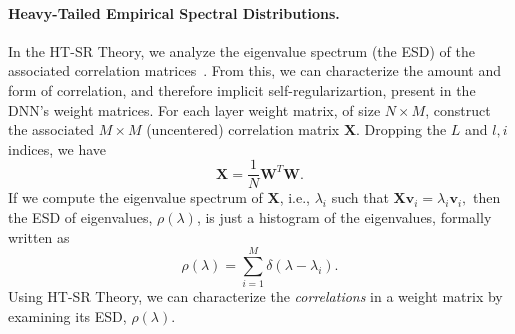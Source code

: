 \paragraph{Heavy-Tailed Empirical Spectral Distributions.}
%
%
In the HT-SR Theory, we analyze the eigenvalue spectrum (the ESD) of the associated correlation matrices~\cite{MM18_TR,MM19_HTSR_ICML}.
From this, we can characterize the amount and form of correlation, and therefore implicit self-regularizartion, present in the DNN's weight matrices.
For each layer weight matrix, of size $N \times M$, construct the associated $M\times M$ (uncentered) correlation matrix $\mathbf{X}$. 
Dropping the $L$ and $l,i$ indices, we have
$$
\mathbf{X} = \frac{1}{N}\mathbf{W}^{T}\mathbf{W}.
$$
%
If we compute the eigenvalue spectrum of $\mathbf{X}$, i.e., $\lambda_i$ such that
$  %
\mathbf{X}\mathbf{v}_{i}=\lambda_{i}\mathbf{v}_{i} , 
$  %
then the ESD of eigenvalues, $\rho(\lambda)$, is just a histogram of the eigenvalues, formally written as
\begin{equation}
\rho(\lambda)=\sum\limits_{i=1}^{M}\delta(\lambda-\lambda_{i})  .
\label{eqn:eigenval_hist}
\end{equation}
%
Using HT-SR Theory, we can characterize the \emph{correlations} in a weight matrix by examining its ESD, $\rho(\lambda)$.
